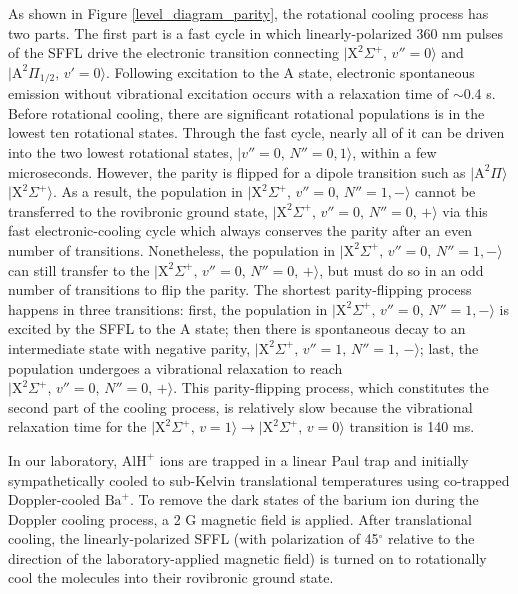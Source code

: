 \documentclass[twoside,twocolumn,9pt]{article}
\begin{document}
As shown in Figure \ref{level_diagram_parity}, the rotational cooling process has two parts. The first part is a fast cycle in which linearly-polarized 360 nm pulses of the SFFL drive the electronic transition connecting $\lvert \mathrm{X}^2\Sigma^+,\, v''=0\rangle$ and $\lvert \mathrm{A}^{2}\Pi_{1/2},\, v'=0\rangle$. Following excitation to the $\mathrm{A}$ state, electronic spontaneous emission without vibrational excitation occurs with a relaxation time of $\sim$0.4 \si{\micro}s.  Before rotational cooling, there are significant rotational populations is in the lowest ten rotational states. Through the fast cycle, nearly all of it can be driven into the two lowest rotational states, $\lvert v''=0,\, N''=0,1\rangle$, within a few microseconds. However, the parity is flipped for a dipole transition such as $\lvert \mathrm{A}^2\Pi\rangle$ \pp{--} $\lvert \mathrm{X}^2\Sigma^+\rangle$. As a result, the population in $\lvert \mathrm{X}^2\Sigma^+,\, v''=0,\, N''=1, -\rangle$ cannot be transferred to the rovibronic ground state, $\lvert \mathrm{X}^2\Sigma^+,\, v''=0,\, N''=0,\, +\rangle$ via this fast electronic-cooling cycle which always conserves the parity after an even number of transitions. Nonetheless, the population in $\lvert \mathrm{X}^2\Sigma^+,\, v''=0,\, N''=1, -\rangle$ can still transfer to the $\lvert \mathrm{X}^2\Sigma^+,\, v''=0,\, N''=0,\, +\rangle$, but must do so in an odd number of transitions to flip the parity. The shortest parity-flipping process happens in three transitions: first, the population in $\lvert \mathrm{X}^2\Sigma^+,\, v''=0,\, N''=1, -\rangle$ is excited by the SFFL to the $\mathrm{A}$ state; then there is spontaneous decay to an intermediate state with negative parity, $\lvert \mathrm{X}^2\Sigma^+,\, v''=1,\, N''=1,\, -\rangle$; last, the population undergoes a vibrational relaxation to reach $\lvert \mathrm{X}^2\Sigma^+,\, v''=0,\, N''=0,\, +\rangle$. This parity-flipping process, which constitutes the second part of the cooling process, is relatively slow because the vibrational relaxation time for the $\lvert \mathrm{X}^2\Sigma^+,\, v=1\rangle \rightarrow \lvert \mathrm{X}^2\Sigma^+,\, v=0\rangle$ transition is 140 ms.\par

In our laboratory, $\mathrm{AlH}^+$ ions are trapped in a linear Paul trap and initially sympathetically cooled to sub-Kelvin translational temperatures using co-trapped Doppler-cooled $\mathrm{Ba}^+$. To remove the dark states of the barium ion during the Doppler cooling process, a 2 G magnetic field is applied. After translational cooling, the linearly-polarized SFFL (with polarization of 45$^{\circ}$ relative to the direction of the laboratory-applied magnetic field) is turned on to rotationally cool the molecules into their rovibronic ground state.\par
\end{document}
